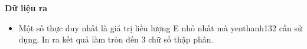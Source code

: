\textbf{Dữ liệu ra }
\begin{itemize}
	\item Một số thực duy nhất là giá trị liều lượng E nhỏ nhất mà yenthanh132 cần sử dụng. In ra kết quả làm tròn đến 3 chữ số thập phân.
\end{itemize}
